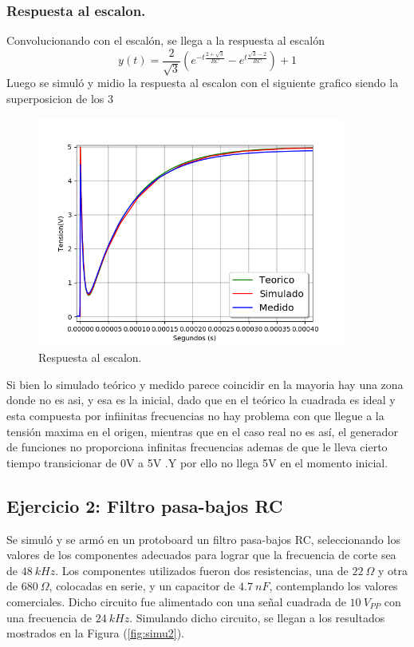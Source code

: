 \documentclass[a4paper]{article}
\begin{document}
\subsubsection{Respuesta al escalon.}
Convolucionando con el escalón, se llega a la respuesta al escalón
\begin{equation}
 y(t) = \frac{2}{\sqrt{3}} \left( e^{-t\frac{2 + \sqrt{3}}{RC}} - e^{t\frac{\sqrt{3} - 2}{RC}} \right) + 1
\label{equ:h*u}
\end{equation} 
Luego se simuló y midio la respuesta al escalon con el siguiente grafico siendo la superposicion de los 3
\begin{figure}[H]
	\centering
	\includegraphics[width=0.9\textwidth]{StepResponse.png}
\caption{Respuesta al escalon.}
	\label{fig:stepResponse}
\end{figure}
Si bien lo simulado teórico y medido parece coincidir en la mayoria hay una zona donde no es asi, y esa es la inicial, dado que en el teórico la cuadrada es ideal y esta compuesta por infiinitas frecuencias no hay problema con que llegue a la tensión maxima en el origen, mientras que en el caso real no es así, el generador de funciones no proporciona infinitas frecuencias ademas de que le lleva cierto tiempo transicionar de 0V a 5V .Y por ello no llega 5V en el momento inicial.

\subsection{Ejercicio 2: Filtro pasa-bajos RC}
Se simuló y se armó en un protoboard un filtro pasa-bajos RC, seleccionando los valores de los componentes adecuados para lograr que la frecuencia de corte sea de $ 48 \ kHz $. Los componentes utilizados fueron dos resistencias, una de $22 \ \Omega$ y otra de $680 \ \Omega$, colocadas en serie, y un capacitor de $4.7 \ nF$, contemplando los valores comerciales.
Dicho circuito fue alimentado con una señal cuadrada de $ 10 \ V_{PP} $ con una frecuencia de $ 24 \ kHz $.
Simulando dicho circuito, se llegan a los resultados mostrados en la Figura (\ref{fig:simu2}).
\end{document}
